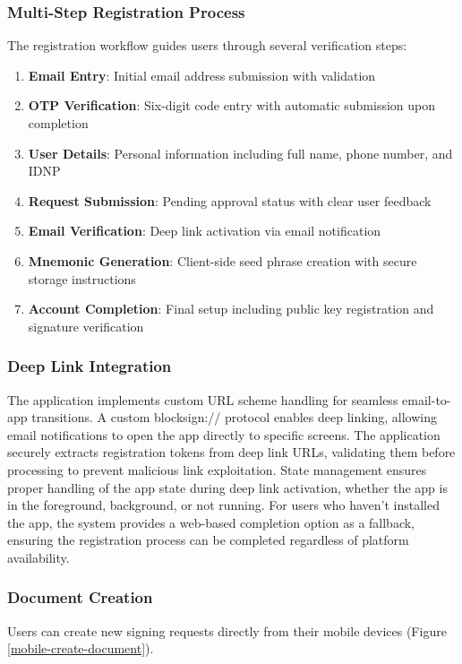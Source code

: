 \subsubsection{Multi-Step Registration Process}
The registration workflow guides users through several verification steps:

\begin{enumerate}
    \item \textbf{Email Entry}: Initial email address submission with validation
    \item \textbf{OTP Verification}: Six-digit code entry with automatic submission upon completion
    \item \textbf{User Details}: Personal information including full name, phone number, and IDNP
    \item \textbf{Request Submission}: Pending approval status with clear user feedback
    \item \textbf{Email Verification}: Deep link activation via email notification
    \item \textbf{Mnemonic Generation}: Client-side seed phrase creation with secure storage instructions
    \item \textbf{Account Completion}: Final setup including public key registration and signature verification
\end{enumerate}

\subsubsection{Deep Link Integration}
The application implements custom URL scheme handling for seamless email-to-app transitions. A custom blocksign:// protocol enables deep linking, allowing email notifications to open the app directly to specific screens. The application securely extracts registration tokens from deep link URLs, validating them before processing to prevent malicious link exploitation. State management ensures proper handling of the app state during deep link activation, whether the app is in the foreground, background, or not running. For users who haven't installed the app, the system provides a web-based completion option as a fallback, ensuring the registration process can be completed regardless of platform availability.

\subsubsection{Document Creation}
Users can create new signing requests directly from their mobile devices (Figure \ref{mobile-create-document}).

